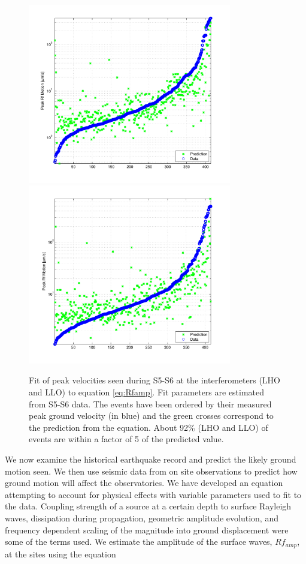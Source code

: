 \documentclass[reprint, prl, aps, showpacs]{revtex4-1}
\begin{document}
\begin{figure}[t]
\hspace*{-0.5cm}
 \includegraphics[width=3.5in]{Prediction_LHO_S5_S6.pdf}
 \includegraphics[width=3.5in]{Prediction_LLO_S5_S6.pdf}
 \caption{Fit of peak velocities seen during S5-S6 at the interferometers (LHO and LLO) to equation \ref{eq:Rfamp}.  Fit parameters are estimated from S5-S6 data. The events have been ordered by their measured peak ground velocity (in blue) and the green crosses correspond to the prediction from the equation. About 92\% (LHO and LLO) of events are within a factor of 5 of the predicted value.}
 \label{fig:regression}
\end{figure}

We now examine the historical earthquake record and predict the likely ground motion seen. We then use seismic data from on site observations to predict how ground motion will affect the observatories. We have developed an equation attempting to account for physical effects with variable parameters used to fit to the data. Coupling strength of a source at a certain depth to surface Rayleigh waves, dissipation during propagation, geometric amplitude evolution, and frequency dependent scaling of the magnitude into ground displacement were some of the terms used. We estimate the amplitude of the surface waves, $Rf_{amp}$, at the sites using the equation
\end{document}
